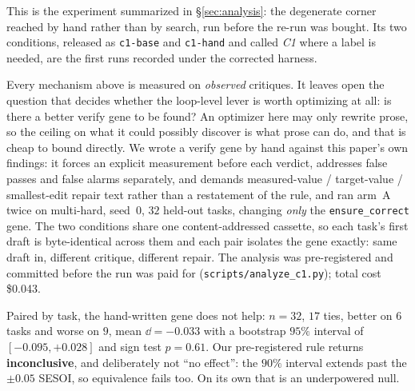 \documentclass[11pt]{article}
\begin{document}
This is the experiment summarized in \S\ref{sec:analysis}: the degenerate corner reached by hand rather than by search, run before the re-run was bought. Its two conditions, released as \texttt{c1-base} and \texttt{c1-hand} and called
\emph{C1} where a label is needed, are the first runs recorded under the corrected harness.

\medskip\noindent
Every mechanism above is measured on \emph{observed} critiques. It leaves open the
question that decides whether the loop-level lever is worth optimizing at all: is there a
better verify gene to be found? An optimizer here may only rewrite prose, so the ceiling
on what it could possibly discover is what prose can do, and that is cheap to bound
directly. We wrote a verify gene by hand against this paper's own findings: it forces an
explicit measurement before each verdict, addresses false passes and false alarms
separately, and demands measured-value / target-value / smallest-edit repair text rather
than a restatement of the rule, and ran arm~A twice on multi-hard, seed~0, $32$ held-out
tasks, changing \emph{only} the \texttt{ensure\_correct} gene. The two conditions share one
content-addressed cassette, so each task's first draft is byte-identical across them and
each pair isolates the gene exactly: same draft in, different critique, different repair.
The analysis was pre-registered and committed before the run was paid for
(\texttt{scripts/analyze\_c1.py}); total cost \$0.043.

Paired by task, the hand-written gene does not help: $n{=}32$, $17$ ties, better on $6$
tasks and worse on $9$, mean $\dd = -0.033$ with a bootstrap $95\%$ interval of
$[-0.095,+0.028]$ and sign test $p=0.61$. Our pre-registered rule returns
\textbf{inconclusive}, and deliberately not ``no effect'': the $90\%$ interval extends past
the $\pm0.05$ SESOI, so equivalence fails too. On its own that is an underpowered null.
\end{document}
